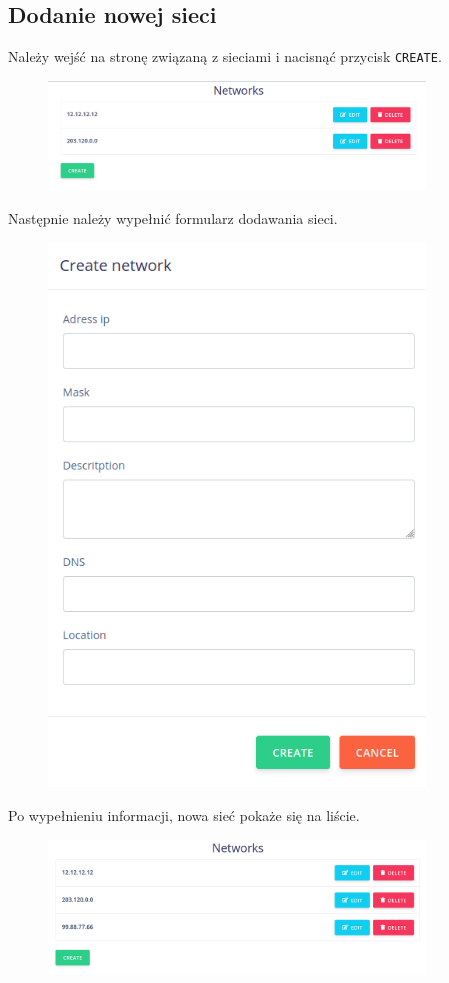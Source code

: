 \documentclass[a4paper,11pt]{article}
\begin{document}
\subsection{Dodanie nowej sieci}
Należy wejść na stronę związaną z sieciami i nacisnąć przycisk \texttt{CREATE}.
\begin{figure}[H]
	\centering
	\includegraphics[width=10cm]{intsr01.png}
\end{figure}
Następnie należy wypełnić formularz dodawania sieci.
\begin{figure}[H]
	\centering
	\includegraphics[width=10cm]{instr02.png}
\end{figure}
Po wypełnieniu informacji, nowa sieć pokaże się na liście.
\begin{figure}[H]
	\centering
	\includegraphics[width=10cm]{instr03.png}
\end{figure}
\end{document}
